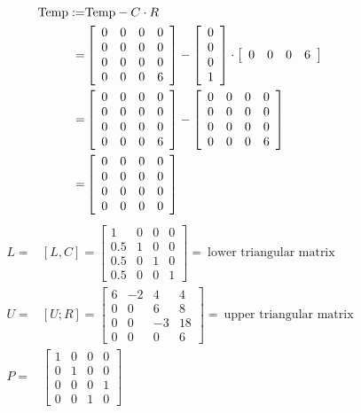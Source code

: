 \begin{align*}
    {\rm Temp} :=& {\rm Temp} - C \cdot R \\
    =& \left[\begin{array}{rrrr} 0 & 0 & 0 & 0\\ 0 & 0 & 0 & 0 \\ 0 & 0 & 0 & 0 \\0 & 0 & 0 & 6 \end{array}\right] 
    - \left[ \begin{array}{r} 0 \\ 0 \\ 0 \\ 1 \end{array} \right] \cdot \left[ \begin{array}{rrrr} 0 & 0 & 0 & 6 \end{array} \right] \\
    =& \left[\begin{array}{rrrr} 0 & 0 & 0 & 0\\ 0 & 0 & 0 & 0 \\ 0 & 0 & 0 & 0 \\0 & 0 & 0 & 6 \end{array}\right] - \left[\begin{array}{rrrr} 0 & 0 & 0 & 0\\ 0 & 0 & 0 & 0 \\ 0 & 0 & 0 & 0 \\0 & 0 & 0 & 6 \end{array}\right] \\
    =& \left[\begin{array}{rrrr} 0 & 0 & 0 & 0\\ 0 & 0 & 0 & 0 \\ 0 & 0 & 0 & 0 \\0 & 0 & 0 & 0 \end{array}\right] \\
\end{align*}
\begin{align*}
    L =& [L, C] = \left[ \begin{array}{rrrr} 1 & 0 & 0 & 0\\ 0.5 & 1 & 0 & 0 \\ 0.5 & 0 & 1 & 0 \\ 0.5 & 0 & 0 & 1  \end{array} \right] = ~\textrm{lower triangular matrix} \\
    U =& [U; R] = \left[ \begin{array}{rrrr} 6 & -2 & 4 & 4 \\ 0 & 0 & 6 & 8 \\ 0 & 0 & -3 & 18 \\ 0 & 0 & 0 & 6  \end{array} \right] = ~\textrm{upper triangular matrix} \\ 
    P =& \left[\begin{array}{rrrr} 1 & 0 & 0 & 0\\ 0 & 1 & 0 & 0 \\ 0 & 0 & 0 & 1 \\0 & 0 & 1 & 0 \end{array}\right]
\end{align*}

